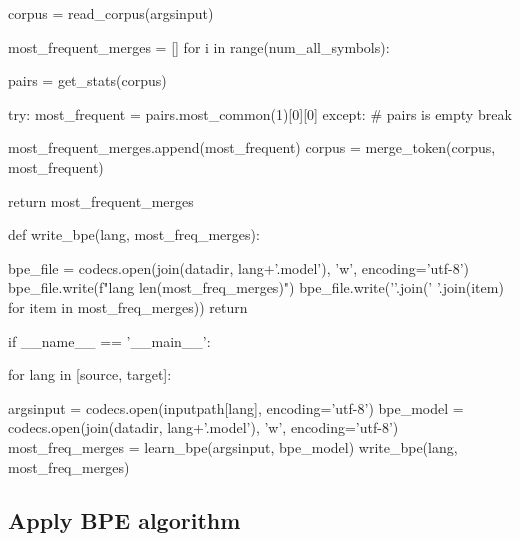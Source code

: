 \begin{python}
  corpus = read_corpus(argsinput)

  most_frequent_merges = []
  for i in range(num_all_symbols):

    pairs = get_stats(corpus)

      try:
        most_frequent = pairs.most_common(1)[0][0]
      except:
        # pairs is empty
        break

      most_frequent_merges.append(most_frequent)
      corpus = merge_token(corpus, most_frequent)

  return most_frequent_merges


def write_bpe(lang, most_freq_merges):

  bpe_file = codecs.open(join(datadir, lang+'.model'), 'w', encoding='utf-8')
  bpe_file.write(f"{lang} {len(most_freq_merges)}\n")
  bpe_file.write('\n'.join(' '.join(item) for item in most_freq_merges))
  return

if __name__ == '__main__':

  for lang in [source, target]:

    argsinput = codecs.open(inputpath[lang], encoding='utf-8')
    bpe_model = codecs.open(join(datadir, lang+'.model'), 'w', encoding='utf-8')
    most_freq_merges = learn_bpe(argsinput, bpe_model)
    write_bpe(lang, most_freq_merges)
\end{python}

\subsection{Apply BPE algorithm}

